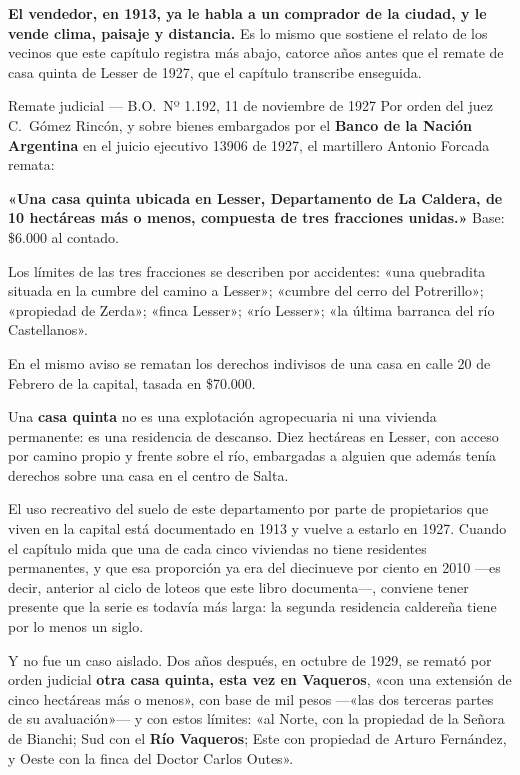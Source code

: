 \textbf{El vendedor, en 1913, ya le habla a un comprador de la ciudad, y le vende clima,
paisaje y distancia.} Es lo mismo que sostiene el relato de los vecinos que este capítulo
registra más abajo, catorce años antes que el remate de casa quinta de Lesser de 1927, que el capítulo
transcribe enseguida.

\begin{ficha}{Remate judicial --- B.O.\ Nº 1.192, 11 de noviembre de 1927}
Por orden del juez C.\ Gómez Rincón, y sobre bienes embargados por el \textbf{Banco de la
Nación Argentina} en el juicio ejecutivo 13906 de 1927, el martillero Antonio Forcada
remata:

\textbf{«Una casa quinta ubicada en Lesser, Departamento de La Caldera, de 10 hectáreas más
o menos, compuesta de tres fracciones unidas.»} Base: \$6.000 al contado.

Los límites de las tres fracciones se describen por accidentes: «una quebradita situada en
la cumbre del camino a Lesser»; «cumbre del cerro del Potrerillo»; «propiedad de Zerda»;
«finca Lesser»; «río Lesser»; «la última barranca del río Castellanos».

En el mismo aviso se rematan los derechos indivisos de una casa en calle 20 de Febrero de
la capital, tasada en \$70.000.
\end{ficha}

Una \textbf{casa quinta} no es una explotación agropecuaria ni una vivienda permanente: es
una residencia de descanso. Diez hectáreas en Lesser, con acceso por camino propio y frente
sobre el río, embargadas a alguien que además tenía derechos sobre una casa en el centro de
Salta.

El uso recreativo del suelo de este departamento por parte de propietarios que viven en la
capital está documentado en 1913 y vuelve a estarlo en 1927. Cuando el capítulo mida que una de cada cinco viviendas no
tiene residentes permanentes, y que esa proporción ya era del diecinueve por ciento en 2010
—es decir, anterior al ciclo de loteos que este libro documenta—, conviene tener presente
que la serie es todavía más larga: la segunda residencia caldereña tiene por lo menos un
siglo.

Y no fue un caso aislado. Dos años después, en octubre de 1929, se remató por orden
judicial \textbf{otra casa quinta, esta vez en Vaqueros}, «con una extensión de cinco
hectáreas más o menos», con base de mil pesos —«las dos terceras partes de su avaluación»—
y con estos límites: «al Norte, con la propiedad de la Señora de Bianchi; Sud con el
\textbf{Río Vaqueros}; Este con propiedad de Arturo Fernández, y Oeste con la finca del
Doctor Carlos Outes».

